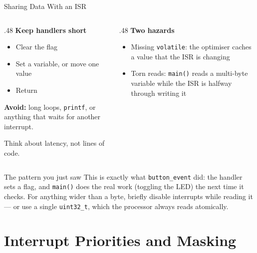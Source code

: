 \documentclass[9pt,aspectratio=169,xcolor=table]{beamer}
\begin{document}
\begin{frame}{Sharing Data With an ISR}
    \begin{columns}[T]
    \begin{column}{.48\textwidth}
        \textbf{Keep handlers short}
        {\small
        \begin{itemize}\itemsep1pt
            \item Clear the flag
            \item Set a variable, or move one value
            \item Return
        \end{itemize}}

        \vspace{2mm}
        {\small \textbf{Avoid:} long loops, \texttt{printf}, or anything
        that waits for another interrupt.}

        \vspace{2mm}
		{\small Think about latency, not lines of code.}
    \end{column}
    \begin{column}{.48\textwidth}
        \textbf{Two hazards}
        {\small
        \begin{itemize}\itemsep1pt
            \item \alert{Missing \texttt{volatile}}: the optimiser caches a
                  value that the ISR is changing
            \item \alert{Torn reads}: \texttt{main()} reads a multi-byte
                  variable while the ISR is halfway through writing it
        \end{itemize}}
    \end{column}
    \end{columns}

    \vspace{3mm}
    \begin{block}{The pattern you just saw}
        This is exactly what \texttt{button\_event} did: the handler sets
        a \alert{flag}, and \texttt{main()} does the real work (toggling
        the LED) the next time it checks. For anything wider than a byte,
        briefly disable interrupts while reading it --- or use a single
        \texttt{uint32\_t}, which the processor always reads atomically.
    \end{block}
\end{frame}


\section{Interrupt Priorities and Masking}
\end{document}
